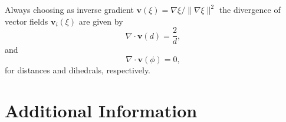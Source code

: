 Always choosing as inverse gradient $\textbf{v}(\xi) = \nabla \xi/\|\nabla \xi \| ^2$ the divergence of vector fields $\textbf{v}_i(\xi)$ are given by
\begin{equation}
  \nabla \cdot \textbf{v}(d) = \frac{2}{d},
\end{equation}
and
\begin{equation}
  \nabla \cdot \textbf{v}(\phi) = 0,
\end{equation}
for distances and dihedrals, respectively.

\section{Additional Information}
\label{sec:num examples}

